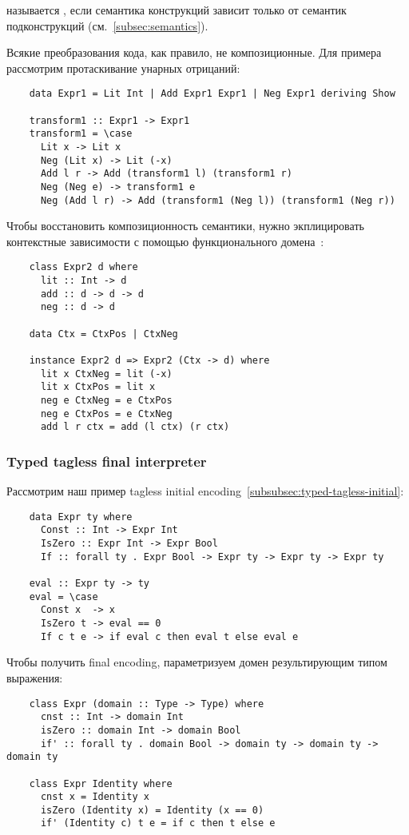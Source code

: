  называется , если семантика конструкций зависит только от семантик подконструкций (см.~\ref{subsec:semantics}).

Всякие преобразования кода, как правило, не композиционные.
Для примера рассмотрим протаскивание унарных отрицаний:
\begin{verbatim}
    data Expr1 = Lit Int | Add Expr1 Expr1 | Neg Expr1 deriving Show

    transform1 :: Expr1 -> Expr1
    transform1 = \case
      Lit x -> Lit x
      Neg (Lit x) -> Lit (-x)
      Add l r -> Add (transform1 l) (transform1 r)
      Neg (Neg e) -> transform1 e
      Neg (Add l r) -> Add (transform1 (Neg l)) (transform1 (Neg r))
\end{verbatim}

Чтобы восстановить композиционность семантики, нужно экплицировать контекстные зависимости с помощью функционального домена~\cite{kiselyov2012typed}:
\begin{verbatim}
    class Expr2 d where
      lit :: Int -> d
      add :: d -> d -> d
      neg :: d -> d

    data Ctx = CtxPos | CtxNeg

    instance Expr2 d => Expr2 (Ctx -> d) where
      lit x CtxNeg = lit (-x)
      lit x CtxPos = lit x
      neg e CtxNeg = e CtxPos
      neg e CtxPos = e CtxNeg
      add l r ctx = add (l ctx) (r ctx)
\end{verbatim}

\subsubsection{Typed tagless final interpreter}

Рассмотрим наш пример tagless initial encoding~\ref{subsubsec:typed-tagless-initial}:
\begin{verbatim}
    data Expr ty where
      Const :: Int -> Expr Int
      IsZero :: Expr Int -> Expr Bool
      If :: forall ty . Expr Bool -> Expr ty -> Expr ty -> Expr ty

    eval :: Expr ty -> ty
    eval = \case
      Const x  -> x
      IsZero t -> eval == 0
      If c t e -> if eval c then eval t else eval e
\end{verbatim}
Чтобы получить final encoding, параметризуем домен результирующим типом выражения:
\begin{verbatim}
    class Expr (domain :: Type -> Type) where
      cnst :: Int -> domain Int
      isZero :: domain Int -> domain Bool
      if' :: forall ty . domain Bool -> domain ty -> domain ty -> domain ty

    class Expr Identity where
      cnst x = Identity x
      isZero (Identity x) = Identity (x == 0)
      if' (Identity c) t e = if c then t else e
\end{verbatim}

